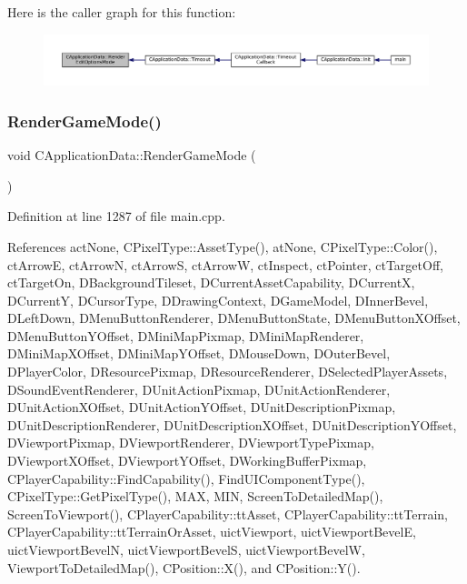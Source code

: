 Here is the caller graph for this function\+:\nopagebreak
\begin{figure}[H]
\begin{center}
\leavevmode
\includegraphics[width=350pt]{classCApplicationData_a7da1dd0b9a8d7c68d8df5f60b4e94189_icgraph}
\end{center}
\end{figure}
\hypertarget{classCApplicationData_ae5ba05c6fb7e6f0414c26f0b44bc842c}{}\label{classCApplicationData_ae5ba05c6fb7e6f0414c26f0b44bc842c} 
\subsubsection{\texorpdfstring{Render\+Game\+Mode()}{RenderGameMode()}}
{\footnotesize\ttfamily void C\+Application\+Data\+::\+Render\+Game\+Mode (\begin{DoxyParamCaption}{ }\end{DoxyParamCaption})\hspace{0.3cm}{\ttfamily [protected]}}



Definition at line 1287 of file main.\+cpp.



References act\+None, C\+Pixel\+Type\+::\+Asset\+Type(), at\+None, C\+Pixel\+Type\+::\+Color(), ct\+ArrowE, ct\+ArrowN, ct\+ArrowS, ct\+ArrowW, ct\+Inspect, ct\+Pointer, ct\+Target\+Off, ct\+Target\+On, D\+Background\+Tileset, D\+Current\+Asset\+Capability, D\+CurrentX, D\+CurrentY, D\+Cursor\+Type, D\+Drawing\+Context, D\+Game\+Model, D\+Inner\+Bevel, D\+Left\+Down, D\+Menu\+Button\+Renderer, D\+Menu\+Button\+State, D\+Menu\+Button\+X\+Offset, D\+Menu\+Button\+Y\+Offset, D\+Mini\+Map\+Pixmap, D\+Mini\+Map\+Renderer, D\+Mini\+Map\+X\+Offset, D\+Mini\+Map\+Y\+Offset, D\+Mouse\+Down, D\+Outer\+Bevel, D\+Player\+Color, D\+Resource\+Pixmap, D\+Resource\+Renderer, D\+Selected\+Player\+Assets, D\+Sound\+Event\+Renderer, D\+Unit\+Action\+Pixmap, D\+Unit\+Action\+Renderer, D\+Unit\+Action\+X\+Offset, D\+Unit\+Action\+Y\+Offset, D\+Unit\+Description\+Pixmap, D\+Unit\+Description\+Renderer, D\+Unit\+Description\+X\+Offset, D\+Unit\+Description\+Y\+Offset, D\+Viewport\+Pixmap, D\+Viewport\+Renderer, D\+Viewport\+Type\+Pixmap, D\+Viewport\+X\+Offset, D\+Viewport\+Y\+Offset, D\+Working\+Buffer\+Pixmap, C\+Player\+Capability\+::\+Find\+Capability(), Find\+U\+I\+Component\+Type(), C\+Pixel\+Type\+::\+Get\+Pixel\+Type(), M\+AX, M\+IN, Screen\+To\+Detailed\+Map(), Screen\+To\+Viewport(), C\+Player\+Capability\+::tt\+Asset, C\+Player\+Capability\+::tt\+Terrain, C\+Player\+Capability\+::tt\+Terrain\+Or\+Asset, uict\+Viewport, uict\+Viewport\+BevelE, uict\+Viewport\+BevelN, uict\+Viewport\+BevelS, uict\+Viewport\+BevelW, Viewport\+To\+Detailed\+Map(), C\+Position\+::\+X(), and C\+Position\+::\+Y().



